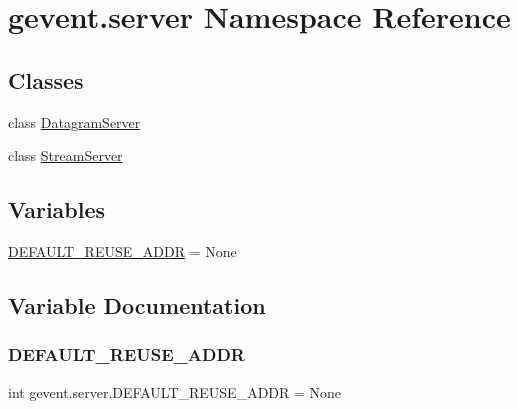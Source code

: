 \hypertarget{namespacegevent_1_1server}{}\section{gevent.\+server Namespace Reference}
\label{namespacegevent_1_1server}
\subsection*{Classes}
\begin{DoxyCompactItemize}
\item 
class \hyperlink{classgevent_1_1server_1_1_datagram_server}{Datagram\+Server}
\item 
class \hyperlink{classgevent_1_1server_1_1_stream_server}{Stream\+Server}
\end{DoxyCompactItemize}
\subsection*{Variables}
\begin{DoxyCompactItemize}
\item 
\hyperlink{namespacegevent_1_1server_a0057b5e7f72886b334e710fd3ae365c0}{D\+E\+F\+A\+U\+L\+T\+\_\+\+R\+E\+U\+S\+E\+\_\+\+A\+D\+DR} = None
\end{DoxyCompactItemize}


\subsection{Variable Documentation}
\mbox{\label{namespacegevent_1_1server_a0057b5e7f72886b334e710fd3ae365c0}} 
\subsubsection{\texorpdfstring{D\+E\+F\+A\+U\+L\+T\+\_\+\+R\+E\+U\+S\+E\+\_\+\+A\+D\+DR}{DEFAULT\_REUSE\_ADDR}}
{\footnotesize\ttfamily int gevent.\+server.\+D\+E\+F\+A\+U\+L\+T\+\_\+\+R\+E\+U\+S\+E\+\_\+\+A\+D\+DR = None}

